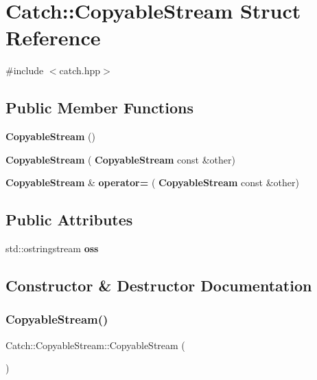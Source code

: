 \section{Catch\+:\+:Copyable\+Stream Struct Reference}
\label{struct_catch_1_1_copyable_stream}


{\ttfamily \#include $<$catch.\+hpp$>$}

\subsection*{Public Member Functions}
\begin{DoxyCompactItemize}
\item 
\textbf{ Copyable\+Stream} ()
\item 
\textbf{ Copyable\+Stream} (\textbf{ Copyable\+Stream} const \&other)
\item 
\textbf{ Copyable\+Stream} \& \textbf{ operator=} (\textbf{ Copyable\+Stream} const \&other)
\end{DoxyCompactItemize}
\subsection*{Public Attributes}
\begin{DoxyCompactItemize}
\item 
std\+::ostringstream \textbf{ oss}
\end{DoxyCompactItemize}


\subsection{Constructor \& Destructor Documentation}
\mbox{\label{struct_catch_1_1_copyable_stream_a5a61d0da675ae00cd46efaef4c445cdd}} 
\subsubsection{Copyable\+Stream()\hspace{0.1cm}{\footnotesize\ttfamily [1/2]}}
{\footnotesize\ttfamily Catch\+::\+Copyable\+Stream\+::\+Copyable\+Stream (\begin{DoxyParamCaption}{ }\end{DoxyParamCaption})\hspace{0.3cm}{\ttfamily [inline]}}

